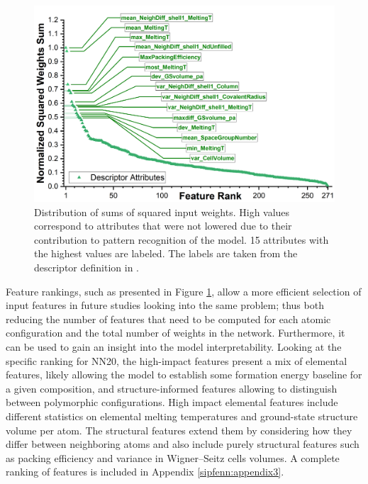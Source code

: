 \begin{figure}[h]
    \centering
    \begin{minipage}[c]{0.65\textwidth}
    \includegraphics[width=\textwidth]{sipfenn/squaredweightssumNN20_V2.png}
    \end{minipage}\hfill
    \begin{minipage}[c]{0.33\textwidth}
    \caption{Distribution of sums of squared input weights. High values correspond to attributes that were not lowered due to their contribution to pattern recognition of the model. 15 attributes with the highest values are labeled. The labels are taken from the descriptor definition in  \cite{Ward2016AMaterials}.}
    \label{sipfenn:fig:squaredweights}
    \end{minipage}
\end{figure}

Feature rankings, such as presented in Figure \ref{sipfenn:fig:squaredweights}, allow a more efficient selection of input features in future studies looking into the same problem; thus both reducing the number of features that need to be computed for each atomic configuration and the total number of weights in the network. Furthermore, it can be used to gain an insight into the model interpretability. Looking at the specific ranking for NN20, the high-impact features present a mix of elemental features, likely allowing the model to establish some formation energy baseline for a given composition, and structure-informed features allowing to distinguish between polymorphic configurations. High impact elemental features include different statistics on elemental melting temperatures and ground-state structure volume per atom. The structural features extend them by considering how they differ between neighboring atoms and also include purely structural features such as packing efficiency and variance in Wigner–Seitz cells volumes. A complete ranking of features is included in Appendix \ref{sipfenn:appendix3}.

